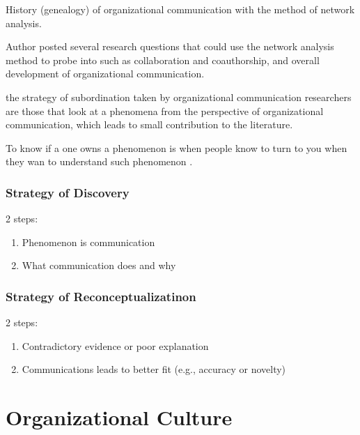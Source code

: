 \documentclass[
]{book}
\providecommand{\tightlist}{%
  \setlength{\itemsep}{0pt}\setlength{\parskip}{0pt}}
\begin{document}
\citep{DUrso_2014}

History (genealogy) of organizational communication with the method of network analysis.

Author posted several research questions that could use the network analysis method to probe into such as collaboration and coauthorship, and overall development of organizational communication.

\citep{Leonardi_2016}

the strategy of subordination taken by organizational communication researchers are those that look at a phenomena from the perspective of organizational communication, which leads to small contribution to the literature.

To know if a one owns a phenomenon is when people know to turn to you when they wan to understand such phenomenon .

\hypertarget{strategy-of-discovery}{%
\subsection{Strategy of Discovery}\label{strategy-of-discovery}}

2 steps:

\begin{enumerate}
\def\labelenumi{\arabic{enumi}.}
\tightlist
\item
  Phenomenon is communication\\
\item
  What communication does and why
\end{enumerate}

\hypertarget{strategy-of-reconceptualizatinon}{%
\subsection{Strategy of Reconceptualizatinon}\label{strategy-of-reconceptualizatinon}}

2 steps:

\begin{enumerate}
\def\labelenumi{\arabic{enumi}.}
\tightlist
\item
  Contradictory evidence or poor explanation\\
\item
  Communications leads to better fit (e.g., accuracy or novelty)
\end{enumerate}

\hypertarget{organizational-culture}{%
\chapter{Organizational Culture}\label{organizational-culture}}
\end{document}
